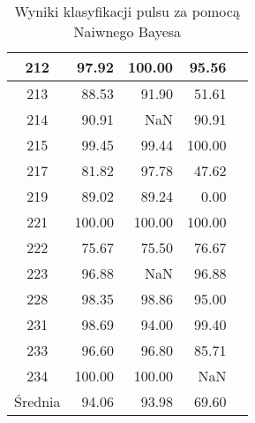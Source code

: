 \begin{table}
\begin{tabular}{|c|r|r|r|r|}
		\hline
		212 & 97.92      & 100.00     & 95.56      \\
		\hline
		213 & 88.53      & 91.90      & 51.61      \\
		\hline
		214 & 90.91      & NaN        & 90.91      \\
		\hline
		215 & 99.45      & 99.44      & 100.00     \\
		\hline
		217 & 81.82      & 97.78      & 47.62      \\
		\hline
		219 & 89.02      & 89.24      & 0.00       \\
		\hline
		221 & 100.00     & 100.00     & 100.00     \\
		\hline
		222 & 75.67      & 75.50      & 76.67      \\
		\hline
		223 & 96.88      & NaN        & 96.88      \\
		\hline
		228 & 98.35      & 98.86      & 95.00      \\
		\hline
		231 & 98.69      & 94.00      & 99.40      \\
		\hline
		233 & 96.60      & 96.80      & 85.71      \\
		\hline
		234 & 100.00     & 100.00     & NaN        \\
		\hline
		Średnia & 94.06      & 93.98      & 69.60      \\
        \hline
	\end{tabular}
	\caption{Wyniki klasyfikacji pulsu za pomocą Naiwnego Bayesa}
	\label{tab:skutecznosc}	
\end{table}